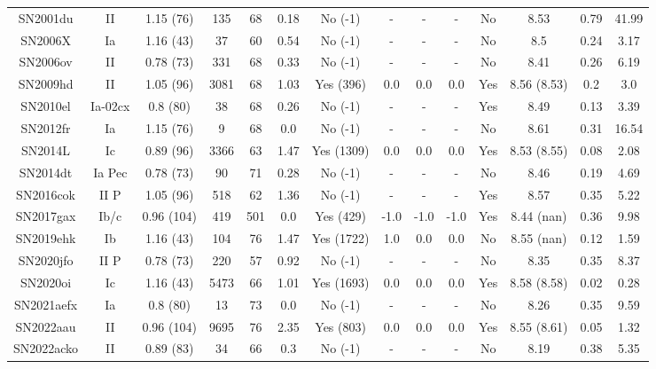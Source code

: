 \begin{table}
\begin{tabular}{cccccccccccccc}
SN2001du & II & 1.15 (76) & 135 & 68 & 0.18 & No (-1) & - & - & - & No & 8.53 & 0.79 & 41.99 \\
SN2006X & Ia & 1.16 (43) & 37 & 60 & 0.54 & No (-1) & - & - & - & No & 8.5 & 0.24 & 3.17 \\
SN2006ov & II & 0.78 (73) & 331 & 68 & 0.33 & No (-1) & - & - & - & No & 8.41 & 0.26 & 6.19 \\
SN2009hd & II & 1.05 (96) & 3081 & 68 & 1.03 & Yes (396) & 0.0 & 0.0 & 0.0 & Yes & 8.56 (8.53) & 0.2 & 3.0 \\
SN2010el & Ia-02cx & 0.8 (80) & 38 & 68 & 0.26 & No (-1) & - & - & - & Yes & 8.49 & 0.13 & 3.39 \\
SN2012fr & Ia & 1.15 (76) & 9 & 68 & 0.0 & No (-1) & - & - & - & No & 8.61 & 0.31 & 16.54 \\
SN2014L & Ic & 0.89 (96) & 3366 & 63 & 1.47 & Yes (1309) & 0.0 & 0.0 & 0.0 & Yes & 8.53 (8.55) & 0.08 & 2.08 \\
SN2014dt & Ia Pec & 0.78 (73) & 90 & 71 & 0.28 & No (-1) & - & - & - & No & 8.46 & 0.19 & 4.69 \\
SN2016cok & II P & 1.05 (96) & 518 & 62 & 1.36 & No (-1) & - & - & - & Yes & 8.57 & 0.35 & 5.22 \\
SN2017gax & Ib/c & 0.96 (104) & 419 & 501 & 0.0 & Yes (429) & -1.0 & -1.0 & -1.0 & Yes & 8.44 (nan) & 0.36 & 9.98 \\
SN2019ehk & Ib & 1.16 (43) & 104 & 76 & 1.47 & Yes (1722) & 1.0 & 0.0 & 0.0 & No & 8.55 (nan) & 0.12 & 1.59 \\
SN2020jfo & II P & 0.78 (73) & 220 & 57 & 0.92 & No (-1) & - & - & - & No & 8.35 & 0.35 & 8.37 \\
SN2020oi & Ic & 1.16 (43) & 5473 & 66 & 1.01 & Yes (1693) & 0.0 & 0.0 & 0.0 & Yes & 8.58 (8.58) & 0.02 & 0.28 \\
SN2021aefx & Ia & 0.8 (80) & 13 & 73 & 0.0 & No (-1) & - & - & - & No & 8.26 & 0.35 & 9.59 \\
SN2022aau & II & 0.96 (104) & 9695 & 76 & 2.35 & Yes (803) & 0.0 & 0.0 & 0.0 & Yes & 8.55 (8.61) & 0.05 & 1.32 \\
SN2022acko & II & 0.89 (83) & 34 & 66 & 0.3 & No (-1) & - & - & - & No & 8.19 & 0.38 & 5.35 \\
\end{tabular}
\end{table}
